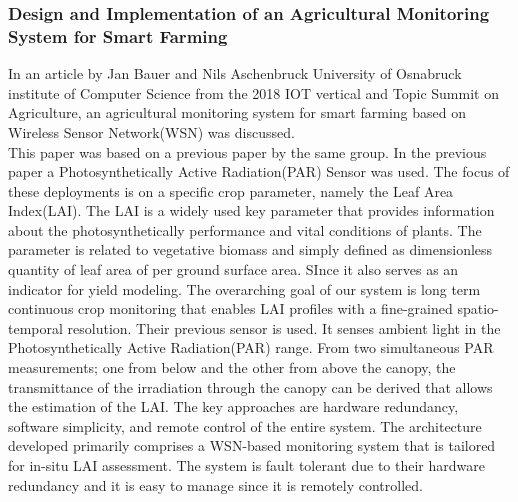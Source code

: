 \documentclass[12pt, a4paper]{article}
\begin{document}
\subsubsection{Design and Implementation of an Agricultural Monitoring System for Smart Farming}
In an article by Jan Bauer and Nils Aschenbruck \cite{8373022} University of Osnabruck institute of Computer Science from the 2018 IOT vertical and Topic Summit on Agriculture, an agricultural monitoring system for smart farming based on Wireless Sensor Network(WSN) was discussed.\\
This paper was based on a previous paper by the same group. In the previous paper a Photosynthetically Active Radiation(PAR) Sensor was used. The focus of these deployments is on a specific crop parameter, namely the Leaf Area Index(LAI). The LAI is a widely used key parameter that provides information about the photosynthetically performance and vital conditions of plants. The parameter is related to vegetative biomass and simply defined as dimensionless quantity of leaf area of per ground surface area. SInce it also serves as an indicator for yield modeling. The overarching goal of our system is long term continuous crop monitoring that enables LAI profiles with a fine-grained  spatio-temporal resolution. Their previous sensor is used. It senses ambient light in the Photosynthetically Active Radiation(PAR) range. From two simultaneous  PAR measurements; one from below and the other from above the canopy, the transmittance of the irradiation through the canopy can be derived that allows the estimation of the LAI. The key approaches are hardware redundancy, software simplicity, and remote control of the entire system. The architecture developed primarily comprises a WSN-based monitoring system that is tailored for in-situ LAI assessment. The system is fault tolerant due to their hardware redundancy and it is easy to manage since it is remotely controlled.
\end{document}
